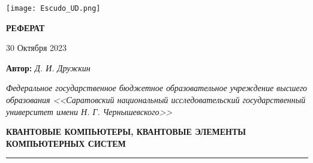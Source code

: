 \onecolumn\begin{@twocolumntrue}
    \begin{minipage}{0.3\textwidth}{\texttt{[image: Escudo\_UD.png]}}
    \end{minipage}
    \vspace{10pt}
    \begin{minipage}{0.677\textwidth}
        \begin{center}
            \vspace{12mm}
        
            \Large{\textbf{РЕФЕРАТ}}
            \vspace{4mm}

            30 Октября 2023 %
            \vspace{2mm}
            
            \large{\textbf{Автор:}\textit{ Д. И. Дружкин}} %
            \vspace{2mm}
    
            \large{\textit{Федеральное государственное бюджетное образовательное учреждение высшего образования <<Саратовский национальный исследовательский государственный университет имени Н. Г. Чернышевского>>}}
            \vspace{2mm}

            \textbf{КВАНТОВЫЕ КОМПЬЮТЕРЫ, КВАНТОВЫЕ ЭЛЕМЕНТЫ КОМПЬЮТЕРНЫХ СИСТЕМ}\\
\footnotesize   
        \end{center}
\end{minipage}
\noindent\textcolor{rojopro}{\rule{\textwidth}{3pt}}
\end{@twocolumntrue}
